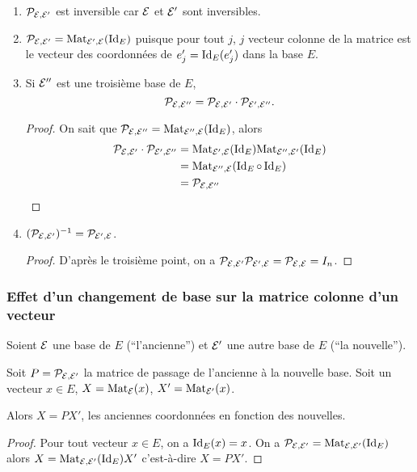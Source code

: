 \begin{prop}
  \begin{enumerate}
  \item $\P_{\E,\E'}$ est inversible car $\E$ et $\E'$ sont inversibles.
  \item $\P_{\E,\E'} = \Mat_{\E',\E}(\Id_E)$ puisque pour tout $j$, $j$\ieme{} vecteur colonne de la matrice est le vecteur des coordonnées de $e'_j=\Id_E(e'_j)$ dans la base $E$.
  \item Si $\E''$ est une troisième base de $E$,
    \begin{equation}
      \P_{\E,\E''}=\P_{\E,\E'} \cdot \P_{\E',\E''}.
    \end{equation}
    \begin{proof}
      On sait que $\P_{\E,\E''} = \Mat_{\E'',\E}(\Id_E)$, alors
      \begin{align}
        \P_{\E,\E'} \cdot \P_{\E',\E''} &= \Mat_{\E',\E}(\Id_E) \Mat_{\E'',\E'}(\Id_E) \\
        &= \Mat_{\E'',\E}(\Id_E \circ \Id_E) \\
        &=\P_{\E,\E''}
      \end{align}
    \end{proof}
  \item $(\P_{\E,\E'})^{-1} = \P_{\E',\E}$.
    \begin{proof}
      D'après le troisième point, on a $\P_{\E,\E'} \P_{\E',\E}=\P_{\E,\E}=I_n$.
    \end{proof}
  \end{enumerate}
\end{prop}

\subsubsection{Effet d'un changement de base sur la matrice colonne d'un vecteur}

\begin{theo}
  Soient $\E$ une base de $E$ (``l'ancienne'') et $\E'$ une autre base de $E$ (``la nouvelle''). 

Soit $P=\P_{\E,\E'}$ la matrice de passage de l'ancienne à la nouvelle base. Soit un vecteur $x \in E$, $X=\Mat_\E(x)$, $X'=\Mat_{\E'}(x)$. 

Alors $X=PX'$, \danger les anciennes coordonnées en fonction des nouvelles.
\end{theo}
\begin{proof}
  Pour tout vecteur $x \in E$, on a $\Id_E(x)=x$. On a $\P_{\E,\E'} = \Mat_{\E,\E'}(\Id_E)$ alors $X = \Mat_{\E,\E'}(\Id_E) X'$ c'est-à-dire $X=PX'$.
\end{proof}

